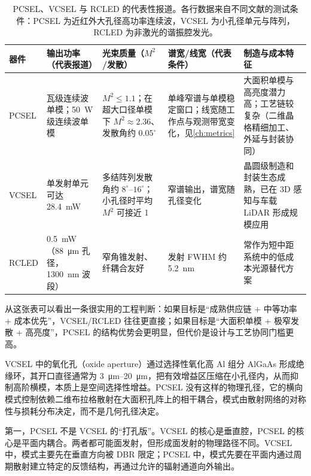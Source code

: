 \begin{table}[htbp]
  \centering
  \footnotesize
  \caption{PCSEL、VCSEL 与 RCLED 的代表性报道。各行数据来自不同文献的测试条件：PCSEL 为近红外大孔径高功率连续波，VCSEL 为小孔径单元与阵列，RCLED 为非激光的谐振腔发光。}
  \label{tab:pcsel_vcsel_rcled_quant}
  \setlength{\tabcolsep}{4pt}
  \begin{tabularx}{\textwidth}{@{}p{}p{}p{}p{}Y@{}}
    \toprule
    器件 & 输出功率（代表报道） & 光束质量（$M^2$/发散） & 谱宽/线宽（代表条件） & 制造与成本特征 \\
    \midrule
    PCSEL &
    瓦级连续波单模\cite{hirose2014}；\SI{50}{W} 级连续波单模\cite{yoshida2023} &
    $M^2\le 1.1$\cite{hirose2014}；在超大口径单模下 $M^2\approx2.36$、发散角约 $0.05^\circ$\cite{yoshida2023} &
    单峰窄谱与单模稳定窗口；线宽随工作点与观测带宽变化，见\cref{ch:metrics} &
    大面积单模与高亮度潜力高；工艺链较复杂（二维晶格精细加工、外延与封装协同） \\
    VCSEL &
    单发射单元可达 \SI{28.4}{mW}\cite{zhang2024arvcsel} &
    多结阵列发散角约 $8^\circ$--$16^\circ$；小孔径时平均 $M^2$ 可接近 1\cite{zhang2024arvcsel} &
    窄谱输出，谱宽随孔径变化\cite{zhang2024arvcsel} &
    晶圆级制造和封装生态成熟，已在 3D 感知与车载 LiDAR 形成规模应用\cite{zhang2024arvcsel} \\
    RCLED &
    \SI{0.5}{mW}（\SI{88}{\micro\meter} 孔径，\SI{1300}{nm} 波段）\cite{sarcan2020rcled} &
    窄角锥发射、纤耦合友好\cite{sarcan2020rcled} &
    发射 FWHM 约 \SI{5.2}{nm}\cite{sarcan2020rcled} &
    常作为短中距系统中的低成本光源替代方案\cite{sarcan2020rcled} \\
    \bottomrule
  \end{tabularx}
\end{table}

从这张表可以看出一条很实用的工程判断：如果目标是“成熟供应链 + 中等功率 + 成本优先”，VCSEL/RCLED 往往更直接；如果目标是“大面积单模 + 极窄发散 + 高亮度”，PCSEL 的结构优势会更明显，但代价是设计与工艺协同门槛更高。

VCSEL 中的氧化孔（oxide aperture）通过选择性氧化高 Al 组分 AlGaAs 形成绝缘环，其开口直径通常为 \SIrange{3}{20}{\micro\meter}，把有效增益区压缩在小孔径内，从而抑制高阶横模，本质上是空间选择性增益。PCSEL 没有这样的物理孔径，它的横向模式控制依赖二维布拉格散射在大面积孔阵上的相干耦合，模式由散射网络的对称性与损耗分布决定，而不是几何孔径决定。

第一，PCSEL 不是 VCSEL 的“打孔版”。VCSEL 的核心是垂直腔，PCSEL 的核心是平面内耦合。两者都可能面发射，但形成面发射的物理路径不同。VCSEL 中，模式主要先在垂直方向被 DBR 限定；PCSEL 中，模式先要在平面内通过周期散射建立特定的反馈结构，再通过允许的辐射通道向外输出。

